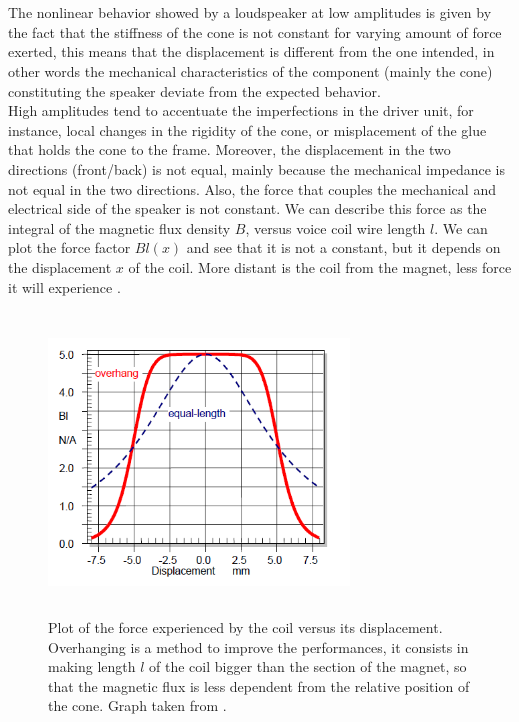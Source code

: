 \\
\\
The nonlinear behavior showed by a loudspeaker at low amplitudes is given by the fact that the stiffness of the cone is not constant for varying amount of force exerted, this means that the displacement is different from the one intended, in other words the mechanical characteristics of the component (mainly the cone) constituting the speaker deviate from the expected behavior.
\\
High amplitudes tend to accentuate the imperfections in the driver unit, for instance, local changes in the rigidity of the cone, or misplacement of the glue that holds the cone to the frame. Moreover, the displacement in the two directions (front/back) is not equal, mainly because the mechanical impedance is not equal in the two directions. Also, the force that couples the mechanical and electrical side of the speaker is not constant. We can describe this force as the integral of the magnetic flux density $B$, versus voice coil wire length $l$. We can plot the force factor $Bl(x)$ and see that it is not a constant, but it depends on the displacement $x$ of the coil. More distant is the coil from the magnet, less force it will experience \parencite{klippel_tutorial:_2006}.

\begin{figure}[th]
\centering
\includegraphics[width=8cm,height=8cm,keepaspectratio]{Figures/displacement}
\decoRule
\caption[Force factor vs. displacement]{Plot of the force experienced by the coil versus its displacement. Overhanging is a method to improve the performances, it consists in making length $l$ of the coil bigger than the section of the magnet, so that the magnetic flux is less dependent from the relative position of the cone. Graph taken from \parencite{klippel_tutorial:_2006}.}
\end{figure}

